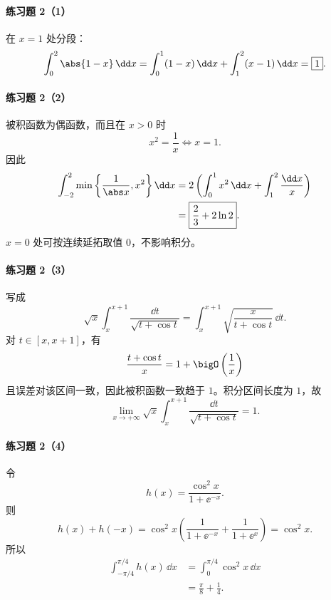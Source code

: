 \paragraph{练习题 2（1）}
\begin{xsolution}
在 $x=1$ 处分段：
\[
  \int_0^2\abs{1-x}\,\dd x
  =\int_0^1(1-x)\,\dd x+\int_1^2(x-1)\,\dd x
  =\boxed{1}.
\]
\end{xsolution}

\paragraph{练习题 2（2）}
\begin{xsolution}
被积函数为偶函数，而且在 $x>0$ 时
\[
  x^2=\frac1x\Longleftrightarrow x=1.
\]
因此
\begin{align*}
  \int_{-2}^2\min\left\{\frac1{\abs x},x^2\right\}\dd x
  &=2\left(\int_0^1x^2\,\dd x+\int_1^2\frac{\dd x}{x}\right)\\
  &=\boxed{\frac23+2\ln2}.
\end{align*}
$x=0$ 处可按连续延拓取值 $0$，不影响积分。
\end{xsolution}

\paragraph{练习题 2（3）}
\begin{xsolution}
写成
\[
  \sqrt x\int_x^{x+1}\frac{\dd t}{\sqrt{t+\cos t}}
  =\int_x^{x+1}\sqrt{\frac{x}{t+\cos t}}\,\dd t.
\]
对 $t\in[x,x+1]$，有
\[
  \frac{t+\cos t}{x}=1+\bigO\left(\frac1x\right)
\]
且误差对该区间一致，因此被积函数一致趋于 $1$。积分区间长度为 $1$，故
\[
  \boxed{\lim_{x\to+\infty}\sqrt x\int_x^{x+1}
  \frac{\dd t}{\sqrt{t+\cos t}}=1}.
\]
\end{xsolution}

\paragraph{练习题 2（4）}
\begin{xsolution}
令
\[
  h(x)=\frac{\cos^2x}{1+\ee^{-x}}.
\]
则
\[
  h(x)+h(-x)
  =\cos^2x\left(\frac1{1+\ee^{-x}}+\frac1{1+\ee^x}\right)
  =\cos^2x.
\]
所以
\begin{align*}
  \int_{-\pi/4}^{\pi/4}h(x)\,\dd x
  &=\int_0^{\pi/4}\cos^2x\,\dd x\\
  &=\boxed{\frac\pi8+\frac14}.
\end{align*}
\end{xsolution}

